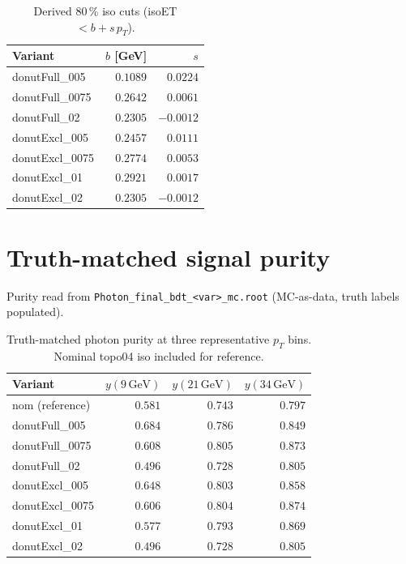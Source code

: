 \documentclass[11pt,a4paper]{article}
\begin{document}
\begin{table}[H]
\centering
\caption{Derived 80\,\% iso cuts (isoET $< b + s\,p_T$).}
\begin{tabular}{lrr}
\toprule
Variant & $b$ [GeV] & $s$ \\
\midrule
donutFull\_005  & $0.1089$ & $0.0224$  \\
donutFull\_0075 & $0.2642$ & $0.0061$  \\
donutFull\_02   & $0.2305$ & $-0.0012$ \\
donutExcl\_005  & $0.2457$ & $0.0111$  \\
donutExcl\_0075 & $0.2774$ & $0.0053$  \\
donutExcl\_01   & $0.2921$ & $0.0017$  \\
donutExcl\_02   & $0.2305$ & $-0.0012$ \\
\bottomrule
\end{tabular}
\end{table}

\section*{Truth-matched signal purity}

Purity read from \texttt{Photon\_final\_bdt\_<var>\_mc.root} (MC-as-data, truth labels populated).

\begin{table}[H]
\centering
\caption{Truth-matched photon purity at three representative $p_T$ bins.
Nominal topo04 iso included for reference.}
\begin{tabular}{lrrr}
\toprule
Variant & $y(9\,\mathrm{GeV})$ & $y(21\,\mathrm{GeV})$ & $y(34\,\mathrm{GeV})$ \\
\midrule
nom (reference) & $0.581$ & $0.743$ & $0.797$ \\
donutFull\_005  & $0.684$ & $0.786$ & $0.849$ \\
donutFull\_0075 & $0.608$ & $0.805$ & $0.873$ \\
donutFull\_02   & $0.496$ & $0.728$ & $0.805$ \\
donutExcl\_005  & $0.648$ & $0.803$ & $0.858$ \\
donutExcl\_0075 & $0.606$ & $0.804$ & $0.874$ \\
donutExcl\_01   & $0.577$ & $0.793$ & $0.869$ \\
donutExcl\_02   & $0.496$ & $0.728$ & $0.805$ \\
\bottomrule
\end{tabular}
\end{table}
\end{document}
